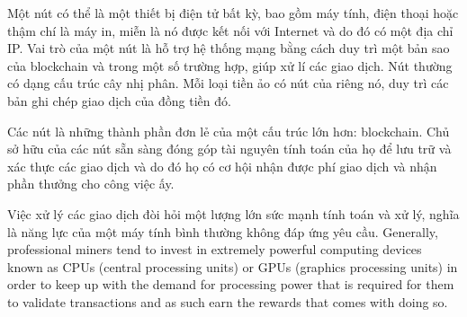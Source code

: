 Một nút có thể là một thiết bị điện tử bất kỳ, bao gồm máy tính, điện thoại hoặc thậm chí là máy in, miễn là nó được kết nối với Internet và do đó có một địa chỉ IP. Vai trò của một nút là hỗ trợ hệ thống mạng bằng cách duy trì một bản sao của blockchain và trong một số trường hợp, giúp xử lí các giao dịch. Nút thường có dạng cấu trúc cây nhị phân. Mỗi loại tiền ảo có nút của riêng nó, duy trì các bản ghi chép giao dịch của đồng tiền đó. 

Các nút là những thành phần đơn lẻ của một cấu trúc lớn hơn: blockchain. Chủ sở hữu của các nút  sẵn sàng đóng góp tài nguyên tính toán của họ để lưu trữ và xác thực các giao dịch và do đó họ có cơ hội nhận được phí giao dịch và nhận phần thưởng cho công việc ấy. 

Việc xử lý các giao dịch đòi hỏi một lượng lớn sức mạnh tính toán và xử lý, nghĩa là năng lực của một máy tính bình thường không đáp ứng yêu cầu. Generally, professional miners tend to invest in extremely powerful computing devices known as CPUs (central processing units) or GPUs (graphics processing units) in order to keep up with the demand for processing power that is required for them to validate transactions and as such earn the rewards that comes with doing so.




 
 
 
 
  
 
 
